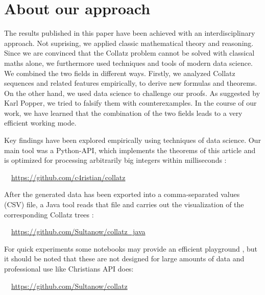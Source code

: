 \chapter*{About our approach}
\label{ch:our_approach}
\vspace{0.8cm}

The results published in this paper have been achieved with an interdisciplinary approach. Not suprising, we applied classic mathematical theory and reasoning. Since we are convinced that the Collatz problem cannot be solved with classical maths alone, we furthermore used techniques and tools of modern data science. We combined the two fields in different ways. Firstly, we analyzed Collatz sequences and related features empirically, to derive new formulas and theorems. On the other hand, we used data science to challenge our proofs. As suggested by Karl Popper, we tried to falsify them with counterexamples. In the course of our work, we have learned that the combination of the two fields leads to a very efficient working mode.

Key findings have been explored empirically using techniques of data science. Our main tool was a Python-API, which implements the theorems of this article and is optimized for processing arbitrarily big integers within milliseconds \cite{Ref_Koch_Github}:

\par\bigskip
\textcolor{wisogreen}\faExternalLink~~\url{https://github.com/c4ristian/collatz}

\par\bigskip\noindent
After the generated data has been exported into a comma-separated values (CSV) file, a Java tool reads that file and carries out the visualization of the corresponding Collatz trees \cite{Ref_Sultanow_Github_Java}:

\par\bigskip
\textcolor{wisogreen}\faExternalLink~~\url{https://github.com/Sultanow/collatz_java}

\par\bigskip
For quick experiments some notebooks may provide an efficient playground \cite{Ref_Sultanow_Github}, but it should be noted that these are not designed for large amounts of data and professional use like Christians API does:

\par\bigskip
\textcolor{wisogreen}\faExternalLink~~\url{https://github.com/Sultanow/collatz}